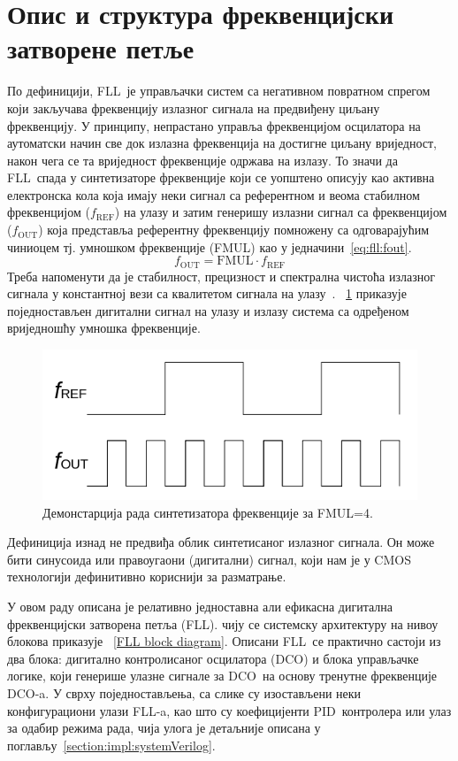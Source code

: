 \documentclass[master]{finthesis}
\def \FLL  {FLL} %
\def \DCO  {DCO} %
\def \PID  {PID} %
\begin{document}
\section{Опис и структура фреквенцијски затворене петље} \label{FLL structure}
По дефиницији, \FLL\ је управљачки систем са негативном повратном спрегом који закључава фреквенцију излазног сигнала на предвиђену циљану фреквенцију. У принципу, непрастано управља фреквенцијом осцилатора на аутоматски начин све док излазна фреквенција на достигне циљану вриједност, након чега се та вриједност фреквенције одржава на излазу. То значи да \FLL\ спада у синтетизаторе фреквенције који се уопштено описују као активна електронска кола која имају неки сигнал са референтном и веома стабилном фреквенцијом ($f_\text{REF}$) на улазу и затим генеришу излазни сигнал са фреквенцијом ($f_\text{OUT}$) која представља референтну фреквенцију помножену са одговарајућим чиниоцем тј. умношком фреквенције (FMUL) као у једначини~\ref{eq:fll:fout}.
\begin{equation}
	\label{eq:fll:fout}
	f_\text{OUT} = \text{FMUL} \cdot f_\text{REF}
\end{equation}
Треба напоменути да је стабилност, прецизност и спектрална чистоћа излазног сигнала у константној вези са квалитетом сигнала на улазу~\cite{Staszewski:FREQUENCY_SYNTHESIZER_CMOS_2005}. \figurename~\ref{fig:fll:fref_fout} приказује поједностављен дигитални сигнал на улазу и излазу система са одређеном вриједношћу умношка фреквенције. \par
\begin{figure}[!h]
	 \centering
	 \includegraphics[scale=0.7]{slike/fll_fref_fout.png}
	 \caption{Демонстарција рада синтетизатора фреквенције за FMUL=4.}
	 \label{fig:fll:fref_fout}
\end{figure}
Дефиниција изнад не предвиђа облик синтетисаног излазног сигнала. Он може бити синусоида или правоугаони (дигитални) сигнал, који нам је у CMOS технологији дефинитивно кориснији за разматрање. \par 
У овом раду описана је релативно једноставна али ефикасна дигитална фреквенцијски затворена петља (\FLL). чију се системску архитектуру на нивоу блокова приказује \figurename~\ref{FLL block diagram}. Описани \FLL\ се практично састоји из два блока: дигитално контролисаног осцилатора (\DCO) и блока управљачке логике, који генерише улазне сигнале за \DCO\ на основу тренутне фреквенције \DCO-a. У сврху поједностављења, са слике су изостављени неки конфигурациони улази \FLL-a, као што су коефицијенти \PID\ контролера или улаз за одабир режима рада, чија улога је детаљније описана у поглављу~\ref{section:impl:systemVerilog}. 
\end{document}
